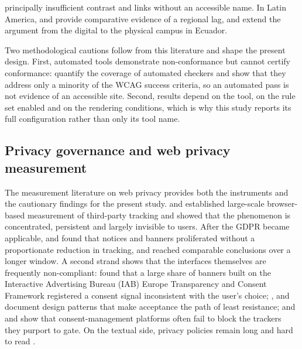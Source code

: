 \documentclass[pdflatex,sn-basic,Numbered,iicol]{sn-jnl}
\theoremstyle{thmstyleone}
\theoremstyle{thmstyletwo}
\theoremstyle{thmstylethree}
\begin{document}
principally insufficient contrast and links without an accessible name. In Latin America, \citet{acostavargas2020dataset} and \citet{acostavargas2020improve} provide comparative evidence of a regional lag, and \citet{maldonadogarces2025physical} extend the argument from the digital to the physical campus in Ecuador.

Two methodological cautions follow from this literature and shape the present design. First, automated tools demonstrate non-conformance but cannot certify conformance: \citet{fischer2025coverage} quantify the coverage of automated checkers and show that they address only a minority of the WCAG success criteria, so an automated pass is not evidence of an accessible site. Second, results depend on the tool, on the rule set enabled and on the rendering conditions, which is why this study reports its full configuration rather than only its tool name.

\subsection{Privacy governance and web privacy measurement}\label{sec:related-privacy}

The measurement literature on web privacy provides both the instruments and the cautionary findings for the present study. \citet{libert2015exposing} and \citet{englehardt2016online} established large-scale browser-based measurement of third-party tracking and showed that the phenomenon is concentrated, persistent and largely invisible to users. After the GDPR became applicable, \citet{degeling2019value} and \citet{trevisan2019four} found that notices and banners proliferated without a proportionate reduction in tracking, and \citet{kretschmer2021cookie} reached comparable conclusions over a longer window. A second strand shows that the interfaces themselves are frequently non-compliant: \citet{matte2020cookie} found that a large share of banners built on the Interactive Advertising Bureau (IAB) Europe Transparency and Consent Framework registered a consent signal inconsistent with the user's choice; \citet{nouwens2020dark}, \citet{gray2021dark} and \citet{habib2022okay} document design patterns that make acceptance the path of least resistance; and \citet{sanchezrola2019can} and \citet{bollinger2022automating} show that consent-management platforms often fail to block the trackers they purport to gate. On the textual side, privacy policies remain long and hard to read \citep{fabian2017largescale,belcheva2023understanding}.
\end{document}
